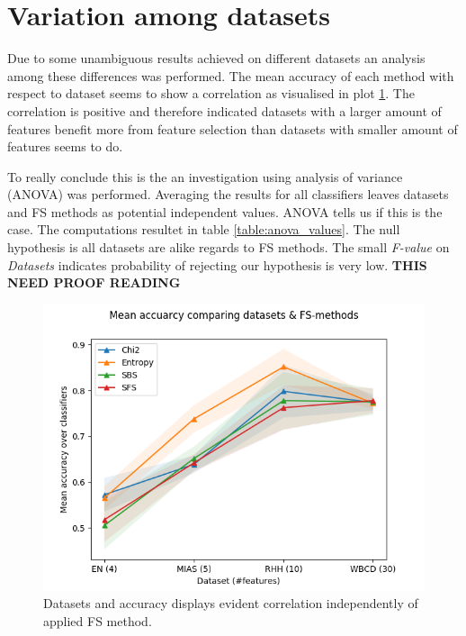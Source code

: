 \section{Variation among datasets}

Due to some unambiguous results achieved on different datasets an analysis among these differences was performed. The mean accuracy of each method with respect to dataset seems to show a correlation as visualised in plot \ref{fig:comp_acc_datasets}. The correlation is positive and therefore indicated datasets with a larger amount of features benefit more from feature selection than datasets with smaller amount of features seems to do.

To really conclude this is the an investigation using analysis of variance (ANOVA) was performed. Averaging the results for all classifiers leaves datasets and FS methods as potential independent values. ANOVA tells us if this is the case. The computations resultet in table \ref{table:anova_values}. The null hypothesis is all datasets are alike regards to FS methods. The small \textit{F-value} on \textit{Datasets} indicates probability of rejecting our hypothesis is very low.
\textbf{THIS NEED PROOF READING}

\begin{figure}[ht!]
  \centering
  \includegraphics[width=0.7\linewidth]{../plots_with_std_fill/comp_acc_datasets.png}
  \caption{Datasets and accuracy displays evident correlation independently of applied FS method.}
  \label{fig:comp_acc_datasets}
\end{figure}


